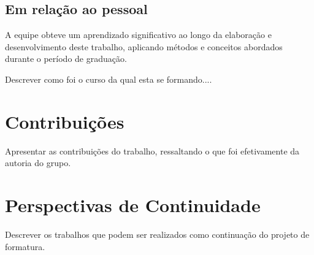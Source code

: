 \documentclass[]{politex}
\begin{document}
\subsection{Em relação ao pessoal}
A equipe obteve um aprendizado significativo ao longo da elaboração e desenvolvimento deste trabalho, aplicando métodos e conceitos abordados durante o período de graduação.

Descrever como foi o curso da qual esta se formando....



\section{Contribuições}
Apresentar as contribuições do trabalho, ressaltando o que foi efetivamente da autoria do grupo.

\section{Perspectivas de Continuidade}
Descrever os trabalhos que podem ser realizados como continuação do projeto de formatura.




%



% 



\end{document}
